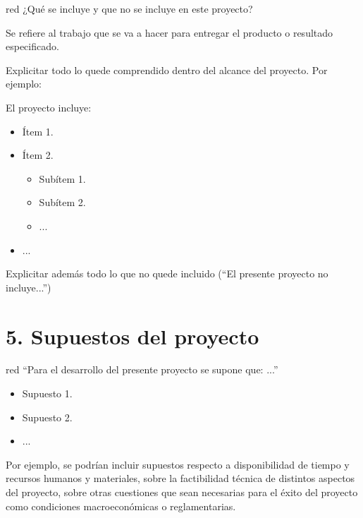 \documentclass[
11pt, %
]{charter}
\begin{document}
\begin{consigna}{red}
¿Qué se incluye y que no se incluye en este proyecto?

Se refiere al trabajo que se va a hacer para entregar el producto o resultado especificado. 

Explicitar todo lo quede comprendido dentro del alcance del proyecto. Por ejemplo:

El proyecto incluye:
\begin{itemize}
	\item Ítem 1.
	\item Ítem 2.
		\begin{itemize}
		\item Subítem 1.
		\item Subítem 2.
		\item ...
		\end{itemize}
	\item ...
	
\end{itemize}

Explicitar además todo lo que no quede incluido (``El presente proyecto no incluye...'')

\end{consigna} %


\section{5. Supuestos del proyecto}
\label{sec:supuestos}

\begin{consigna}{red} %
``Para el desarrollo del presente proyecto se supone que: ...''

\begin{itemize}
	\item Supuesto 1.
	\item Supuesto 2.
	\item ...
\end{itemize}

Por ejemplo, se podrían incluir supuestos respecto a disponibilidad de tiempo y recursos humanos y materiales, sobre la factibilidad técnica de distintos aspectos del proyecto, sobre otras cuestiones que sean necesarias para el éxito del proyecto como condiciones macroeconómicas o reglamentarias.

\end{consigna} %
\end{document}

